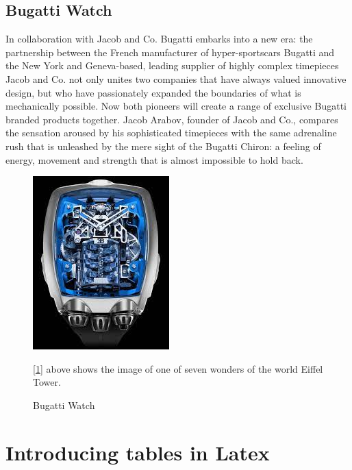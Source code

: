 \documentclass{article}
\begin{document}
\subsection{Bugatti Watch}
In collaboration with Jacob and Co. Bugatti embarks into a new era: the partnership between the French manufacturer of hyper-sportscars Bugatti and the New York and Geneva-based, leading supplier of highly complex timepieces Jacob and Co. not only unites two companies that have always valued innovative design, but who have passionately expanded the boundaries of what is mechanically possible. Now both pioneers will create a range of exclusive Bugatti branded products together. Jacob Arabov, founder of Jacob and Co., compares the sensation aroused by his sophisticated timepieces with the same adrenaline rush that is unleashed by the mere sight of the Bugatti Chiron: a feeling of energy, movement and strength that is almost impossible to hold back.
\\
\begin{figure}[h]
\includegraphics[scale= 0.8]{watch.jpeg}
\caption{Bugatti Watch}
\label{fig : Bugatti Watch}
[\ref{fig : Bugatti Watch}] above shows the image of one of seven wonders of the world Eiffel Tower.
\end{figure}

\section{Introducing tables in Latex}
\end{document}
